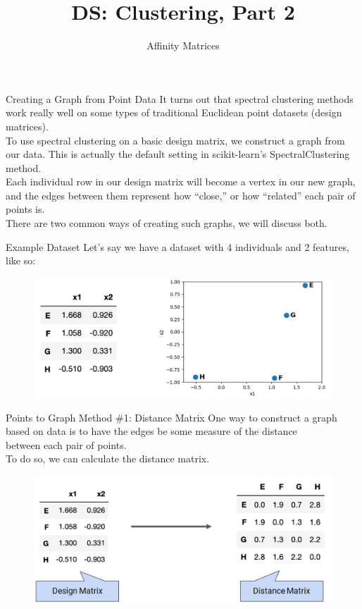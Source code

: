 \documentclass[aspectratio=169]{../latex_main/tntbeamer}  %
\title[Introduction]{DS: Clustering, Part 2}
\subtitle{Affinity Matrices}
\begin{document}
	
	\maketitle
	\begin{frame}{Creating a Graph from Point Data}
	    It turns out that spectral clustering methods work really well on some types of traditional Euclidean point datasets (design matrices).\\
	    \bigskip
	    To use spectral clustering on a basic design matrix, we construct a graph from our data. This is actually the default setting in scikit-learn’s SpectralClustering method.\\
	    \bigskip
	    Each individual row in our design matrix will become a vertex in our new graph, and the edges between them represent how “close,” or how “related” each pair of points is.\\
	    \bigskip
	    There are two common ways of creating such graphs, we will discuss both.
	\end{frame}
	
	
	\begin{frame}{Example Dataset}
	    Let’s say we have a dataset with 4 individuals and 2 features, like so:
	    \begin{figure}
	        \centering
	        \includegraphics[scale=.5]{Bild17}
	    \end{figure}
	\end{frame}
	
	
	\begin{frame}{Points to Graph Method \#1: Distance Matrix}
	    One way to construct a graph based on data is to have the edges be some measure of the distance\\ between each pair of points.\\
        To do so, we can calculate the distance matrix.

	    \begin{figure}
	        \centering
	        \includegraphics[scale=.4]{Bild18}
	    \end{figure}
	\end{frame}
	
\end{document}
